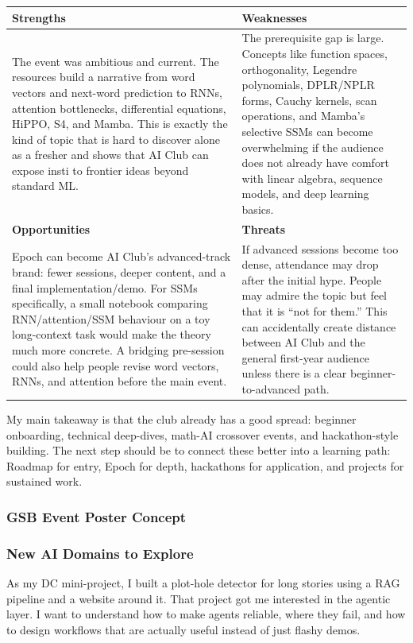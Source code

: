 \documentclass[11pt,a4paper]{article}
\newcommand{\answergap}{\vspace{0.9em}}
\begin{document}
\begin{center}
\renewcommand{\arraystretch}{1.35}
\begin{tabular}{p{}|p{}}
\textbf{Strengths} & \textbf{Weaknesses} \\
\hline
The event was ambitious and current. The resources build a narrative from word vectors and next-word prediction to RNNs, attention bottlenecks, differential equations, HiPPO, S4, and Mamba. This is exactly the kind of topic that is hard to discover alone as a fresher and shows that AI Club can expose insti to frontier ideas beyond standard ML. & The prerequisite gap is large. Concepts like function spaces, orthogonality, Legendre polynomials, DPLR/NPLR forms, Cauchy kernels, scan operations, and Mamba's selective SSMs can become overwhelming if the audience does not already have comfort with linear algebra, sequence models, and deep learning basics. \\
\hline
\textbf{Opportunities} & \textbf{Threats} \\
\hline
Epoch can become AI Club's advanced-track brand: fewer sessions, deeper content, and a final implementation/demo. For SSMs specifically, a small notebook comparing RNN/attention/SSM behaviour on a toy long-context task would make the theory much more concrete. A bridging pre-session could also help people revise word vectors, RNNs, and attention before the main event. & If advanced sessions become too dense, attendance may drop after the initial hype. People may admire the topic but feel that it is ``not for them.'' This can accidentally create distance between AI Club and the general first-year audience unless there is a clear beginner-to-advanced path. \\
\end{tabular}
\end{center}

My main takeaway is that the club already has a good spread: beginner onboarding, technical deep-dives, math-AI crossover events, and hackathon-style building. The next step should be to connect these better into a learning path: Roadmap for entry, Epoch for depth, hackathons for application, and projects for sustained work.

\subsubsection{GSB Event Poster Concept}
\answergap

\subsubsection{New AI Domains to Explore}
As my DC mini-project, I built a plot-hole detector for long stories using a RAG pipeline and a website around it. That project got me interested in the agentic layer. I want to understand how to make agents reliable, where they fail, and how to design workflows that are actually useful instead of just flashy demos.
\end{document}

